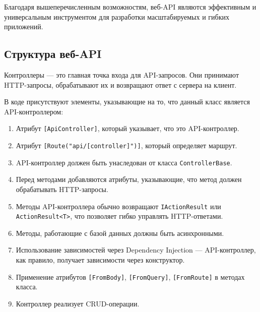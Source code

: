 \documentclass[a4paper,12pt]{report}
\begin{document}
Благодаря вышеперечисленным возможностям, веб-\acs{API} являются эффективным и 
универсальным инструментом для разработки масштабируемых и гибких приложений.


\subsection{Структура веб-\acs{API}}

Контроллеры –-- это главная точка входа для \acs{API}-запросов. Они принимают \acs{HTTP}-запросы, обрабатывают их и возвращают ответ с сервера на клиент.

В коде присутствуют элементы, указывающие на то, что данный класс является \acs{API}-контроллером:
\begin{enumerate}
  \item
      Атрибут \texttt{[ApiController]}, который указывает, что это \acs{API}-контроллер.
  \item
      Атрибут \texttt{[Route("api/[controller]")]}, который определяет маршрут.
  \item
      \acs{API}-контроллер должен быть унаследован от класса \texttt{ControllerBase}.

  \item
      Перед методами добавляются атрибуты, указывающие, что метод должен обрабатывать \acs{HTTP}-запросы.

  \item
      Методы \acs{API}-контроллера обычно возвращают \texttt{IActionResult} или \texttt{ActionResult<T>}, что позволяет гибко управлять \acs{HTTP}-ответами.
  \item
      Методы, работающие с базой данных должны быть асинхронными.

  \item
      Использование зависимостей через Dependency Injection --- \acs{API}-контроллер, как правило, получает зависимости через конструктор.

  \item
      Применение атрибутов \texttt{[FromBody]}, \texttt{[FromQuery]}, \texttt{[FromRoute]} в методах класса.

  \item
      Контроллер реализует \acs{CRUD}-операции.
\end{enumerate}
\end{document}
